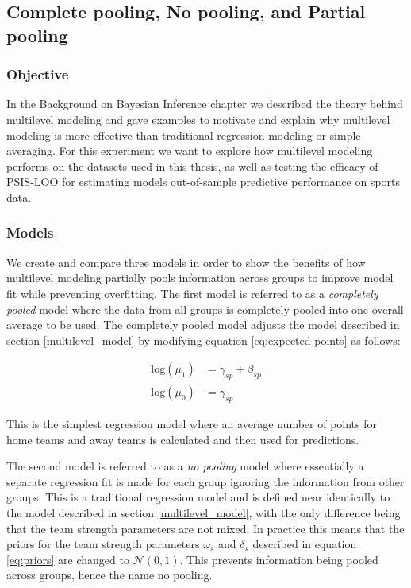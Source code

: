 \subsection{Complete pooling, No pooling, and Partial pooling}

\subsubsection*{Objective}

In the Background on Bayesian Inference chapter we described the theory behind multilevel modeling and gave examples to motivate and explain why multilevel modeling is more effective than traditional regression modeling or simple averaging. For this experiment we want to explore how multilevel modeling performs on the datasets used in this thesis, as well as testing the efficacy of PSIS-LOO for estimating models out-of-sample predictive performance on sports data.

\subsubsection*{Models}

We create and compare three models in order to show the benefits of how multilevel modeling partially pools information across groups to improve model fit while preventing overfitting. The first model is referred to as a \textit{completely pooled} model where the data from all groups is completely pooled into one overall average to be used. The completely pooled model adjusts the model described in section \ref{multilevel_model} by modifying equation \ref{eq:expected points} as follows:

\begin{equation} \label{eq:cp_model}
\begin{split}
\text{log}(\mu_{1}) &= \gamma_{sp} + \beta_{sp} \\
\text{log}(\mu_{0}) &= \gamma_{sp}
\end{split}
\end{equation}

This is the simplest regression model where an average number of points for home teams and away teams is calculated and then used for predictions.

The second model is referred to as a \textit{no pooling} model where essentially a separate regression fit is made for each group ignoring the information from other groups. This is a traditional regression model and is defined near identically to the model described in section \ref{multilevel_model}, with the only difference being that the team strength parameters are not mixed. In practice this means that the priors for the team strength parameters $\omega_s$ and $\delta_s$ described in equation \ref{eq:priors} are changed to $\mathcal{N}(0, 1)$. This prevents information being pooled across groups, hence the name no pooling.

